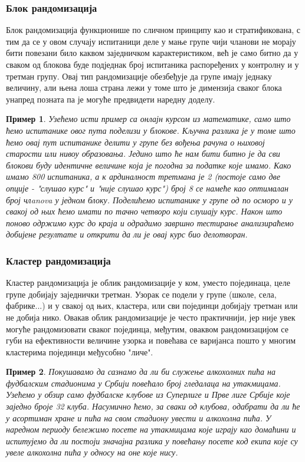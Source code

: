 \documentclass[12pt, a4paper]{article}
\newtheorem{primer}{Пример}[section]
\begin{document}
\subsubsection*{Блок рандомизација}

Блок рандомизација функционише по сличном принципу као и стратификована, с тим да се у овом случају испитаници деле у мање групе чији чланови не морају бити повезани било каквом 
заједничком карактеристиком, већ је само битно да у сваком од блокова буде подједнак број 
испитаника распоређених у контролну и у третман групу. Овај тип рандомизације обезбеђује да групе 
имају једнаку величину, али њена лоша страна лежи у томе што је димензија сваког блока унапред 
позната па је могуће предвидети наредну доделу. 

\begin{primer}
Узећемо исти пример са онлајн курсом из математике, само што ћемо испитанике овог пута поделизи у 
блокове. Кључна разлика је у томе што ћемо овај пут испитанике делити у групе без вођења рачуна о 
њиховој старости или нивоу образовања. Једино што ће нам бити битно је да сви блокови буду 
идентичне величине која је погодна за податке које имамо. Како имамо 800 испитаника, а к
ардиналност третмана је 2 (постоје само две опције - \textit{"слушао курс"} и 
\textit{"није слушао курс"}) број 8 се намеће као оптималан број члanova у једном блоку. 
Поделићемо испитанике у групе од по осморо и у свакој од њих ћемо имати по тачно четворо који 
слушају курс. Након што поново одржимо курс до краја и одрадимо завршно тестирање 
анализираћемо добијене резултате и открити да ли је овај курс био делотворан.
\end{primer}

\subsubsection*{Кластер рандомизација}

Кластер рандомизација је облик рандомизације у ком, уместо појединаца, целе групе добијају 
заједнички третман. Узорак се подели у групе (школе, села, фабрике...) и у свакој од њих, кластера, или сви појединци добијају третман или не добија нико.
Овакав облик рандомизације је често практичнији, јер није увек могуће рандомизовати сваког 
појединца, међутим, оваквом рандомизацијом се губи на ефективности величине узорка и повећава се 
варијанса пошто у многим кластерима појединци међусобно "личе". 

\begin{primer}
Покушавамо да сазнамо да ли би служење алкохолних пића на фудбалским стадионима у Србији повећало 
број гледалаца на утакмицама. Узећемо у обзир само фудбалске клубове из Суперлиге и Прве лиге Србије 
које заједно броје 32 клуба. Насумично ћемо, за сваки од клубова, одабрати да ли ће у асортиман 
хране и пића на свом стадиону увести и алкохолна пића. У наредном периоду бележимо посете на утакмицама 
које играју као домаћини и испитујемо да ли постоји значајна разлика у повећању посете код екипа 
које су увеле алкохолна пића у односу на оне које нису.
\end{primer}
\end{document}
